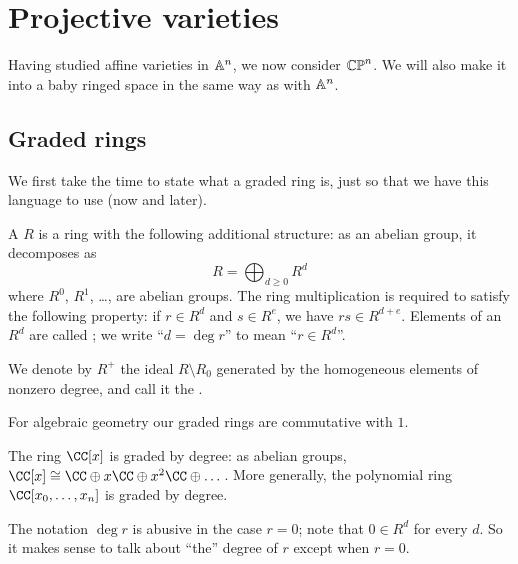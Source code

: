 \chapter{Projective varieties}
Having studied affine varieties in $\mathbb A^n$, we now consider $\mathbb{CP}^n$.
We will also make it into a baby ringed space
in the same way as with $\mathbb A^n$.

\section{Graded rings}
We first take the time to state what a graded ring is,
just so that we have this language to use (now and later).

\begin{definition}
	A  $R$ is a ring with the following additional structure:
	as an abelian group, it decomposes as
	\[ R = \bigoplus_{d \ge 0} R^d \]
	where $R^0$, $R^1$, \dots, are abelian groups.
	The ring multiplication is required to satisfy the following property:
	if $r \in R^d$ and $s \in R^e$, we have $rs \in R^{d+e}$.
	Elements of an $R^d$ are called ;
	we write ``$d = \deg r$'' to mean ``$r \in R^d$''.

	We denote by $R^+$ the ideal $R \setminus R_0$ generated by
	the homogeneous elements of nonzero degree,
	and call it the .
\end{definition}
\begin{remark}
	For algebraic geometry our graded rings are commutative with $1$.
\end{remark}
\begin{example}
	\listhack
	\begin{enumerate}[(a)]
		\ii The ring $\CC[x]$ is graded by degree: as abelian groups,
		$\CC[x] \cong \CC \oplus x\CC \oplus x^2\CC \oplus \dots$.
		\ii More generally, the polynomial ring $\CC[x_0, \dots, x_n]$
		is graded by degree.
	\end{enumerate}
\end{example}
\begin{abuse}
	The notation $\deg r$ is abusive in the case $r = 0$;
	note that $0 \in R^d$ for every $d$.
	So it makes sense to talk about ``the'' degree of $r$
	except when $r = 0$.
\end{abuse}


